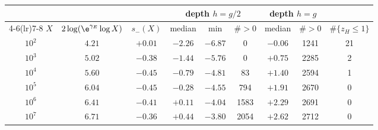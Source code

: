 \begin{tabular}{@{}c cc ccc cc c@{}}
\toprule
 & & & \multicolumn{3}{c}{depth $h=g/2$} & \multicolumn{2}{c}{depth $h=g$} & \\
\cmidrule(lr){4-6}\cmidrule(lr){7-8}
$X$ & $2\log(\e^{\gamma_{E}}\log X)$ & $s_{-}(X)$ & median & min & $\#>0$ & median & $\#>0$ & $\#\{z_{H}\le1\}$\\
\midrule
$10^{2}$ & $4.21$ & $+0.01$ & $-2.26$ & $-6.87$ & 0 & $-0.06$ & 1241 & 21\\
$10^{3}$ & $5.02$ & $-0.38$ & $-1.44$ & $-5.76$ & 0 & $+0.75$ & 2285 & 2\\
$10^{4}$ & $5.60$ & $-0.45$ & $-0.79$ & $-4.81$ & 83 & $+1.40$ & 2594 & 1\\
$10^{5}$ & $6.04$ & $-0.45$ & $-0.28$ & $-4.55$ & 794 & $+1.91$ & 2670 & 0\\
$10^{6}$ & $6.41$ & $-0.41$ & $+0.11$ & $-4.04$ & 1583 & $+2.29$ & 2691 & 0\\
$10^{7}$ & $6.71$ & $-0.36$ & $+0.44$ & $-3.80$ & 2054 & $+2.62$ & 2712 & 0\\
\bottomrule
\end{tabular}
